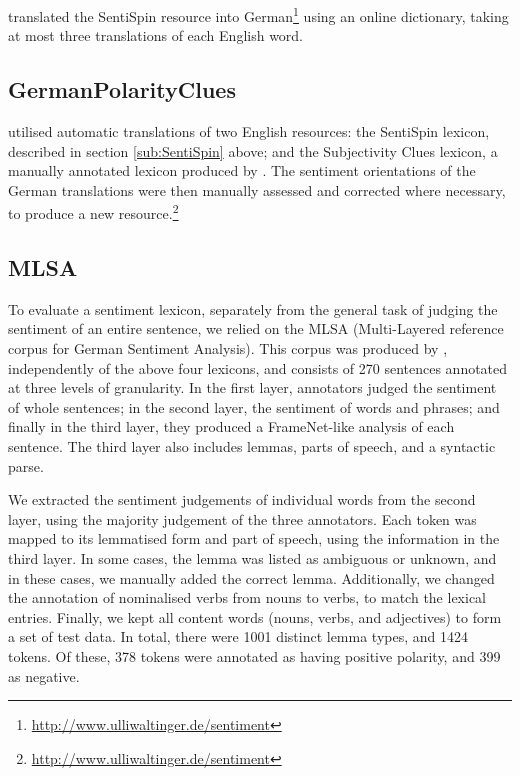 \documentclass[11pt]{article}
\begin{document}
 translated the SentiSpin resource into German\footnote{\url{http://www.ulliwaltinger.de/sentiment}}
using an online dictionary, taking at most three translations of each
English word.


\subsection{GermanPolarityClues}

 utilised automatic translations of two English
resources: the SentiSpin lexicon, described in section \ref{sub:SentiSpin}
above; and the Subjectivity Clues lexicon, a manually annotated lexicon
produced by . The sentiment orientations
of the German translations were then manually assessed and corrected
where necessary, to produce a new resource.\footnote{\url{http://www.ulliwaltinger.de/sentiment}}


\subsection{MLSA} \label{sec:mlsa}

To evaluate a sentiment lexicon, separately from the general task of judging the sentiment of an entire sentence, we relied on the MLSA (Multi-Layered reference corpus for German Sentiment Analysis).  This corpus was produced by , independently of the above four lexicons, and consists of 270 sentences annotated at three levels of granularity.  In the first layer, annotators judged the sentiment of whole sentences; in the second layer, the sentiment of words and phrases; and finally in the third layer, they produced a FrameNet-like analysis of each sentence.  The third layer also includes lemmas, parts of speech, and a syntactic parse.

We extracted the sentiment judgements of individual words from the second layer, using the majority judgement of the three annotators.  Each token was mapped to its lemmatised form and part of speech, using the information in the third layer.  In some cases, the lemma was listed as ambiguous or unknown, and in these cases, we manually added the correct lemma.  Additionally, we changed the annotation of nominalised verbs from nouns to verbs, to match the lexical entries.  Finally, we kept all content words (nouns, verbs, and adjectives) to form a set of test data.  In total, there were 1001 distinct lemma types, and 1424 tokens.  Of these, 378 tokens were annotated as having positive polarity, and 399 as negative.
\end{document}
